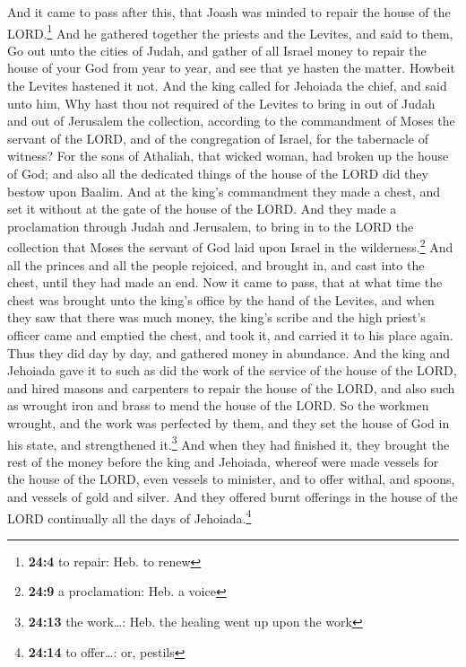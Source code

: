  And it came to pass after this, that Joash was minded to
repair the house of the LORD.\footnote{\textbf{24:4} to repair: Heb. to
  renew}  And he gathered together the priests and the
Levites, and said to them, Go out unto the cities of Judah, and gather
of all Israel money to repair the house of your God from year to year,
and see that ye hasten the matter. Howbeit the Levites hastened it not.
 And the king called for Jehoiada the chief, and said unto
him, Why hast thou not required of the Levites to bring in out of Judah
and out of Jerusalem the collection, according to the commandment of
Moses the servant of the LORD, and of the congregation of Israel, for
the tabernacle of witness?  For the sons of Athaliah, that
wicked woman, had broken up the house of God; and also all the dedicated
things of the house of the LORD did they bestow upon Baalim.
 And at the king's commandment they made a chest, and set
it without at the gate of the house of the LORD.  And they
made a proclamation through Judah and Jerusalem, to bring in to the LORD
the collection that Moses the servant of God laid upon Israel in the
wilderness.\footnote{\textbf{24:9} a proclamation: Heb. a voice}
 And all the princes and all the people rejoiced, and
brought in, and cast into the chest, until they had made an end.
 Now it came to pass, that at what time the chest was
brought unto the king's office by the hand of the Levites, and when they
saw that there was much money, the king's scribe and the high priest's
officer came and emptied the chest, and took it, and carried it to his
place again. Thus they did day by day, and gathered money in abundance.
 And the king and Jehoiada gave it to such as did the
work of the service of the house of the LORD, and hired masons and
carpenters to repair the house of the LORD, and also such as wrought
iron and brass to mend the house of the LORD.  So the
workmen wrought, and the work was perfected by them, and they set the
house of God in his state, and strengthened it.\footnote{\textbf{24:13}
  the work\ldots: Heb. the healing went up upon the work}
 And when they had finished it, they brought the rest of
the money before the king and Jehoiada, whereof were made vessels for
the house of the LORD, even vessels to minister, and to offer withal,
and spoons, and vessels of gold and silver. And they offered burnt
offerings in the house of the LORD continually all the days of
Jehoiada.\footnote{\textbf{24:14} to offer\ldots: or, pestils}

